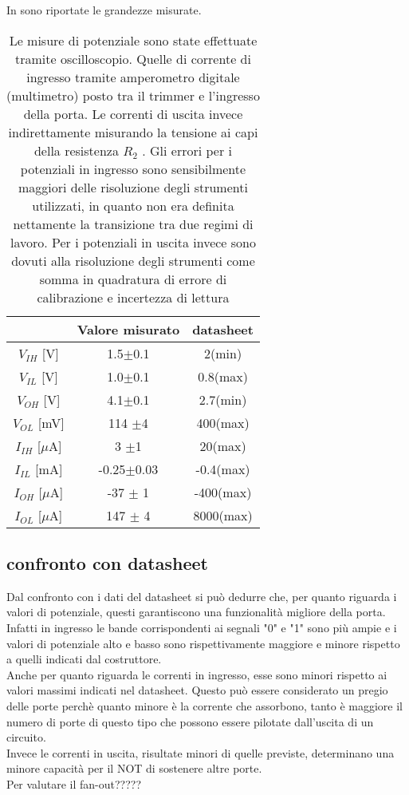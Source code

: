 In  sono riportate le grandezze misurate.\\
\begin{table}[h]
	\centering
	\begin{tabular}{ccc}
		{} & {Valore misurato} & {datasheet} \\
		\hline
    $V_{IH}$ [V] 	  & 1.5$\pm$0.1&  2(min) \\
    $V_{IL}$ [V]	  & 1.0$\pm$0.1&  0.8(max)  \\
    $V_{OH}$ [V]	  & 4.1$\pm$0.1&  2.7(min)\\ %
    $V_{OL}$ [mV]     & 114 $\pm$4&   400(max) \\%
    $I_{IH}$ [$\mu$A] & 3 $\pm$1&     20(max)  \\
    $I_{IL}$ [mA]     & -0.25$\pm$0.03&  -0.4(max) \\
    $I_{OH}$ [$\mu$A] & -37 $\pm$ 1&  -400(max)  \\
    $I_{OL}$ [$\mu$A] & 147 $\pm$ 4&  8000(max) \\
	
  
 	\end{tabular}
	\caption{ Le misure di potenziale sono state effettuate tramite oscilloscopio. Quelle di corrente di ingresso tramite amperometro digitale (multimetro) posto tra il trimmer e l'ingresso della porta. Le correnti di uscita invece indirettamente misurando la tensione ai capi della resistenza $R_{2}$ . Gli errori per i potenziali in ingresso sono sensibilmente maggiori delle risoluzione degli strumenti utilizzati, in quanto non era definita nettamente la transizione tra due regimi di lavoro. Per i potenziali in uscita invece sono dovuti alla risoluzione degli strumenti come somma in quadratura di errore di calibrazione  e incertezza di lettura}
	\label{t:tabella}
\end{table}

\subsection{confronto con datasheet}
Dal confronto con i dati del datasheet si può dedurre che, per quanto riguarda i valori di potenziale, questi garantiscono una funzionalità migliore della porta. Infatti in ingresso le bande corrispondenti ai segnali "0" e "1" sono più ampie e i valori di potenziale alto e basso sono rispettivamente maggiore e minore rispetto a quelli indicati dal costruttore.\\
Anche per quanto riguarda le correnti in ingresso, esse sono minori rispetto ai valori massimi indicati nel datasheet. Questo può essere considerato un pregio delle porte perchè quanto minore è la corrente che assorbono, tanto è maggiore il numero di porte di questo tipo che possono essere pilotate dall'uscita di un circuito.\\
Invece le correnti in uscita, risultate minori di quelle previste, determinano una minore capacità per il NOT di sostenere altre porte.\\
Per valutare il fan-out?????

